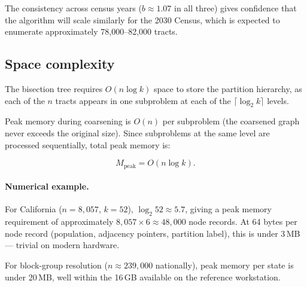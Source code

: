 The consistency across census years ($b \approx 1.07$ in all three) gives
confidence that the algorithm will scale similarly for the 2030 Census,
which is expected to enumerate approximately 78,000--82,000 tracts.

\subsection{Space complexity}

The bisection tree requires $O(n \log k)$ space to store the partition
hierarchy, as each of the $n$ tracts appears in one subproblem at each
of the $\lceil \log_2 k \rceil$ levels.

Peak memory during coarsening is $O(n)$ per subproblem (the coarsened
graph never exceeds the original size).  Since subproblems at the same
level are processed sequentially, total peak memory is:

\[
  M_{\mathrm{peak}} = O(n \log k).
\]

\paragraph{Numerical example.}
For California ($n = 8{,}057$, $k = 52$), $\log_2 52 \approx 5.7$, giving
a peak memory requirement of approximately $8{,}057 \times 6 \approx 48{,}000$
node records.  At 64 bytes per node record (population, adjacency pointers,
partition label), this is under 3\,MB --- trivial on modern hardware.

For block-group resolution ($n \approx 239{,}000$ nationally), peak memory
per state is under 20\,MB, well within the 16\,GB available on the
reference workstation.
